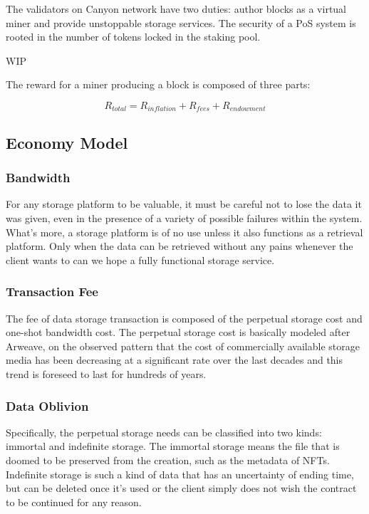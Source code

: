 \documentclass[]{article}
\newcounter{subsubsubsection}[subsubsection]
\begin{document}

The validators on Canyon network have two duties: author blocks as a virtual miner and provide unstoppable storage services. The security of a PoS system is rooted in the number of tokens locked in the staking pool.

WIP


The reward for a miner producing a block is composed of three parts:

$$
R_{total} = R_{inflation} + R_{fees} + R_{endowment}
$$

\subsection{Economy Model}

\subsubsection{Bandwidth}

For any storage platform to be valuable, it must be careful not to lose the data it was given, even in the presence of a variety of possible failures within the system. What's more, a storage platform is of no use unless it also functions as a retrieval platform. Only when the data can be retrieved without any pains whenever the client wants to can we hope a fully functional storage service.

\subsubsection{Transaction Fee}

The fee of data storage transaction is composed of the perpetual storage cost and one-shot bandwidth cost. The perpetual storage cost is basically modeled after Arweave, on the observed pattern that the cost of commercially available storage media has been decreasing at a significant rate over the last decades and this trend is foreseed to last for hundreds of years.

\subsubsection{Data Oblivion}

Specifically, the perpetual storage needs can be classified into two kinds: immortal and indefinite storage. The immortal storage means the file that is doomed to be preserved from the creation, such as the metadata of NFTs. Indefinite storage is such a kind of data that has an uncertainty of ending time, but can be deleted once it's used or the client simply does not wish the contract to be continued for any reason.
\end{document}
